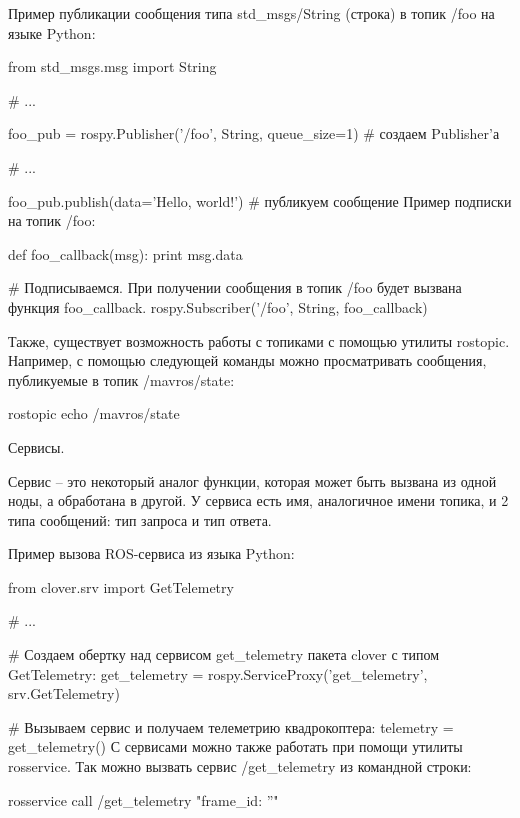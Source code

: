 \begin{Program}[H]
	\caption{Пример публикации сообщения типа std\_msgs/String (строка) в топик /foo на языке Python:} \label{lst:1}
	\begin{MyCode}
from std\_msgs.msg import String

# ...

foo\_pub = rospy.Publisher('/foo', String, queue\_size=1)  # создаем Publisher'а

# ...

foo\_pub.publish(data='Hello, world!')  # публикуем сообщение
Пример подписки на топик /foo:

def foo\_callback(msg):
print msg.data

# Подписываемся. При получении сообщения в топик /foo будет вызвана функция foo\_callback.
rospy.Subscriber('/foo', String, foo\_callback)
	\end{MyCode}
\end{Program}

Также, существует возможность работы с топиками с помощью утилиты rostopic. Например, с помощью следующей команды можно просматривать сообщения, публикуемые в топик /mavros/state:

rostopic echo /mavros/state

Сервисы.


Сервис – это некоторый аналог функции, которая может быть вызвана из одной ноды, а обработана в другой. У сервиса есть имя, аналогичное имени топика, и 2 типа сообщений: тип запроса и тип ответа.

\begin{Program}[H]
	\caption{Пример вызова ROS-сервиса из языка Python:} \label{lst:1}
	\begin{MyCode}
from clover.srv import GetTelemetry

# ...

# Создаем обертку над сервисом get\_telemetry пакета clover с типом GetTelemetry:
get\_telemetry = rospy.ServiceProxy('get\_telemetry', srv.GetTelemetry)

# Вызываем сервис и получаем телеметрию квадрокоптера:
telemetry = get\_telemetry()
С сервисами можно также работать при помощи утилиты rosservice. Так можно вызвать сервис /get\_telemetry из командной строки:

rosservice call /get\_telemetry "{frame\_id: ''}"
	\end{MyCode}
\end{Program}


